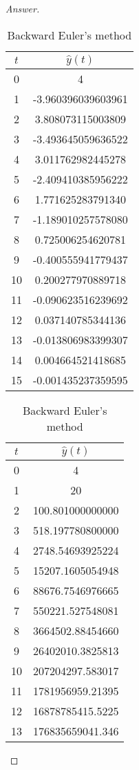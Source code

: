 \begin{proof}[Answer]
\begin{table}[H]
\begin{table}[htbp]
\begin{subtable}[t]{0.32\textwidth}
\begin{tabular}[t]{|c|c|}
		\hline
		\(t\)	&	\(\hat{y}(t)\)	\\	\hline
		0	&	4					\\	\hline
		1	&	-3.960396039603961	\\	\hline
		2	&	3.808073115003809	\\	\hline
		3	&	-3.493645059636522	\\	\hline
		4	&	3.011762982445278	\\	\hline
		5	&	-2.409410385956222	\\	\hline
		6	&	1.771625283791340	\\	\hline
		7	&	-1.189010257578080	\\	\hline
		8	&	0.725006254620781	\\	\hline
		9	&	-0.400555941779437	\\	\hline
		10	&	0.200277970889718	\\	\hline
		11	&	-0.090623516239692	\\	\hline
		12	&	0.037140785344136	\\	\hline
		13	&	-0.013806983399307	\\	\hline
		14	&	0.004664521418685	\\	\hline
		15	&	-0.001435237359595	\\	\hline
		\end{tabular}
		\caption{Backward Euler's method}
	\end{subtable}
	\begin{subtable}[t]{0.32\textwidth}
		\centering
		\begin{tabular}[t]{|c|c|}
		\hline
		\(t\)	&	\(\hat{y}(t)\)	\\	\hline
		0	&	4					\\	\hline
		1	&	20					\\	\hline
		2	&	100.801000000000	\\	\hline
		3	&	518.197780800000	\\	\hline
		4	&	2748.54693925224	\\	\hline
		5	&	15207.1605054948	\\	\hline
		6	&	88676.7546976665	\\	\hline
		7	&	550221.527548081	\\	\hline
		8	&	3664502.88454660	\\	\hline
		9	&	26402010.3825813	\\	\hline
		10	&	207204297.583017	\\	\hline
		11	&	1781956959.21395	\\	\hline
		12	&	16878785415.5225	\\	\hline
		13	&	176835659041.346	\\	\hline

\end{tabular}
\end{subtable}
\end{table}
\end{table}
\end{proof}

